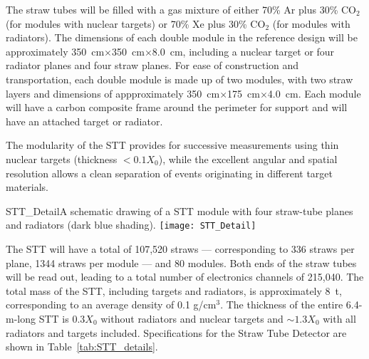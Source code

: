 The straw tubes will be filled with a gas mixture of either 70\% Ar
plus 30\% CO$_2$ (for modules with nuclear targets) or 70\% Xe plus 30\%
CO$_2$ (for modules with radiators).  The dimensions of each double module in
the reference design will be approximately
350~cm$\times$350~cm$\times$8.0~cm, including a nuclear target or four radiator
planes and four straw planes. For ease of construction and
transportation, each double module is made up of two modules, with
two straw layers and dimensions of appproximately 350~cm$\times$175~cm$\times$4.0~cm.  Each
module will have a carbon composite frame around the perimeter for
support and will have an attached target or radiator.


The modularity of the STT provides for successive measurements using
thin nuclear targets (thickness $< 0.1 X_0$), while the excellent
angular and spatial resolution allows a clean separation of events
originating in different target materials.



\begin{cdrfigure}{STT_Detail}{A schematic drawing of a STT module with four straw-tube planes and
radiators (dark blue shading).}
\texttt{[image: STT\_Detail]}
\end{cdrfigure}

The STT will have a total of 107,520 straws  --- corresponding to 336 straws per plane,
1344 straws per module ---
and 80 modules. Both ends of the straw tubes will be read out, leading to a total
number of electronics channels of 215,040. 
The total mass of the STT, including targets and radiators, is approximately 8~t, 
corresponding to an average density of 0.1 g/cm$^3$. %
The thickness of the entire 6.4-m-long STT is $0.3 X_0$ without radiators and nuclear targets and 
$\sim 1.3 X_0$ with all radiators and targets included. 
Specifications for the Straw Tube Detector are shown in Table~\ref{tab:STT_details}.





